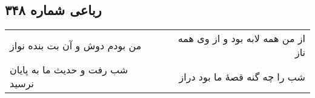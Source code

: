 \begin{center}
\section*{رباعی شماره ۳۴۸}
\label{sec:sh348}
\begin{longtable}{l p{0.5cm} r}
من بودم دوش و آن بت بنده نواز
&&
از من همه لابه بود و از وی همه ناز
\\
شب رفت و حدیث ما به پایان نرسید
&&
شب را چه گنه قصهٔ ما بود دراز
\\
\end{longtable}
\end{center}
